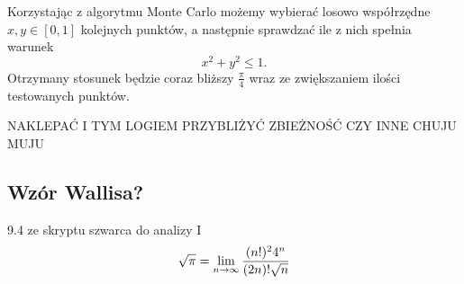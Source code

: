 \begin{center}
\end{center}

Korzystając z algorytmu Monte Carlo możemy wybierać losowo współrzędne $x,y\in[0,1]$ kolejnych punktów, a następnie sprawdzać ile z nich spełnia warunek
$$x^2+y^2\leq1.$$
Otrzymany stosunek będzie coraz bliższy $\frac\pi4$ wraz ze zwiększaniem ilości testowanych punktów.

{\color{cyan}NAKLEPAĆ I TYM LOGIEM PRZYBLIŻYĆ ZBIEŻNOŚĆ CZY INNE CHUJU MUJU}

\subsection{Wzór Wallisa?}
9.4 ze skryptu szwarca do analizy I
$$\sqrt\pi=\lim_{n\to\infty}{(n!)^24^n\over(2n)!\sqrt n}$$